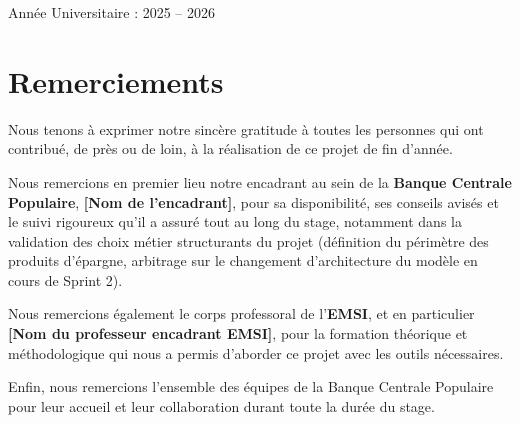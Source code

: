 \documentclass[11pt,a4paper]{report}
\begin{document}
\begin{titlepage}
\vspace{0.7cm}
\begin{center}
    {\sffamily\color{corpslate}\small Année Universitaire : 2025 – 2026}
\end{center}

\end{titlepage}

\chapter*{Remerciements}
Nous tenons à exprimer notre sincère gratitude à toutes les personnes qui ont
contribué, de près ou de loin, à la réalisation de ce projet de fin d'année.

Nous remercions en premier lieu notre encadrant au sein de la \textbf{Banque
Centrale Populaire}, \textbf{[Nom de l'encadrant]}, pour sa disponibilité,
ses conseils avisés et le suivi rigoureux qu'il a assuré tout au long du
stage, notamment dans la validation des choix métier structurants du projet
(définition du périmètre des produits d'épargne, arbitrage sur le
changement d'architecture du modèle en cours de Sprint 2).

Nous remercions également le corps professoral de l'\textbf{EMSI}, et en
particulier \textbf{[Nom du professeur encadrant EMSI]}, pour la formation
théorique et méthodologique qui nous a permis d'aborder ce projet avec les
outils nécessaires.

Enfin, nous remercions l'ensemble des équipes de la Banque Centrale
Populaire pour leur accueil et leur collaboration durant toute la durée du
stage.
\end{document}
